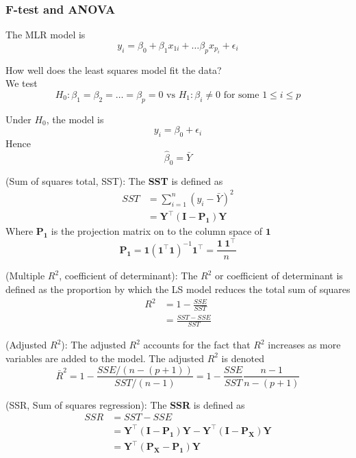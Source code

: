 \subsubsection{F-test and ANOVA}

The MLR model is
\[
    y_i = \beta_0 + \beta_1 x_{1i} + \hdots \beta_p x_{p_i} + \epsilon_i
\]

How well does the least squares model fit the data? \\

We test 
\[
    H_0: \beta_1 = \beta_2 = \hdots = \beta_p = 0 \text{ vs } H_1: \beta_i \neq 0 \text{ for some } 1 \leq i \leq p
\]

Under $H_0$, the model is 
\[
    y_i = \beta_0 + \epsilon_i
\]
Hence
\[
    \hat{\beta}_0 = \bar{Y} 
\]

\begin{definition}
    (Sum of squares total, SST): The \textbf{SST} is defined as 
    \begin{align*}
        SST &= \sum\limits_{i = 1}^{n}  (y_i - \bar{Y} )^2 \\
        &= \bm{Y}^{\top} \left( \bm{I - P_{1}} \right) \bm{Y}
    \end{align*}
    Where $\bm{P_1}$ is the projection matrix on to the column space of $\bm{1}$ 
    \[
        \bm{P_1} = \bm{1} \left( \bm{1}^{\top} \bm{1} \right)^{-1} \bm{1}^{\top} = \frac{\bm{1}\ \bm{1}^{\top} }{n}
    \]
\end{definition}

\begin{definition}
    (Multiple $R^2$, coefficient of determinant): The $R^2$ or coefficient of determinant is defined as the proportion by which the LS model reduces the total sum of squares
    \begin{align*}
        R^2 &= 1 - \frac{SSE}{SST} \\
        &= \frac{SST - SSE}{SST}
    \end{align*}
\end{definition}

\begin{definition}
    (Adjusted $R^2$): The adjusted $R^2$ accounts for the fact that $R^2$ increases as more variables are added to the model. The adjusted $R^2$ is denoted 
    \[
        \bar{R}^2 = 1 - \frac{SSE / (n - (p + 1))}{SST / (n-1)} = 1 - \frac{SSE}{SST} \frac{n-1}{n-(p + 1)}
    \]
\end{definition}

\begin{definition}
    (SSR, Sum of squares regression): The \textbf{SSR} is defined as 
    \begin{align*}
        SSR &= SST - SSE \\
        &= \bm{Y}^{\top} \left( \bm{I - P_1} \right) \bm{Y} - \bm{Y}^{\top} \left( \bm{I - P_X} \right)  \bm{Y} \\
        &= \bm{Y}^{\top} \left( \bm{P_X - P_1} \right)  \bm{Y}
    \end{align*}
\end{definition}

